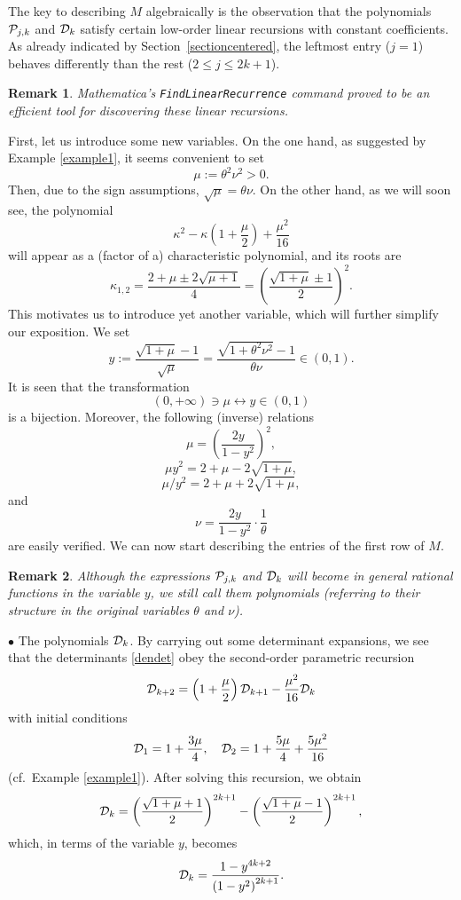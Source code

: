 \documentclass[a4paper]{article}
\newtheorem{remark}{Remark}
\newcommand{\te}{\theta}
\newcommand{\cP}{{\cal{P}}}
\newcommand{\cD}{{\cal{D}}}
\begin{document}
The key to describing $M$ algebraically is the observation that the polynomials $\cP_{j,k}$ and $\cD_{k}$ satisfy certain low-order linear recursions with constant coefficients. As already indicated by Section~\ref{sectioncentered}, the leftmost entry ($j=1$) behaves differently than the rest ($2\le j\le 2k+1$).


\begin{remark}
 \textit{Mathematica}'s  {\tt{FindLinearRecurrence}} command proved to be an efficient tool for discovering these linear recursions. 
\end{remark}
First, let us introduce some new variables. On the one hand, as suggested by Example \ref{example1}, it seems convenient to set
\[
\mu:=\te^2\nu^2>0.
\]
Then, due to the sign assumptions, $\sqrt{\mu}=\te\nu$. On the other hand, as we will soon see, the polynomial 
\[
\kappa ^2-\kappa  \left(1+\frac{\mu }{2}\right)+\frac{\mu ^2}{16}
\]
will appear as a (factor of a) characteristic polynomial, and its roots are
\begin{equation}\label{kappa12}
\kappa_{1,2}=\frac{2+\mu \pm 2 \sqrt{\mu +1}}{4}=\left(\frac{\sqrt{1+\mu}\pm 1}{2}\right)^2.
\end{equation}
This motivates us to introduce yet another variable, which will further simplify our exposition. We set
\begin{equation}\label{ydef01}
y:=\frac{\sqrt{1+\mu}-1}{\sqrt{\mu}}=\frac{\sqrt{1+\te^2\nu^2}-1}{\te\nu}\in (0,1).
\end{equation}
It is seen that the transformation
\[
(0,+\infty)\ni\mu \longleftrightarrow y\in(0,1)
\]
is a bijection. Moreover, the following (inverse) relations 
\[
\mu=\left(\frac{2y}{1-y^2}\right)^2,
\]
\[\mu y^2=2+\mu-2\sqrt{1+\mu},\]
\[\mu/y^2=2+\mu+2\sqrt{1+\mu},\]
and
\begin{equation}\label{fromytonu}
\nu=\frac{2y}{1-y^2}\cdot\frac{1}{\te}
\end{equation}
are easily verified. We can now start describing the entries of the first row of $M$.
\begin{remark}
Although the expressions $\cP_{j,k}$ and $\cD_{k}$ will become in general rational functions in the variable $y$, we still call them polynomials (referring to their structure in the original variables $\te$ and $\nu$). 
\end{remark}
$\bullet$ The polynomials $\cD_k$. By carrying out some determinant expansions, we see that the determinants \eqref{dendet} obey the second-order parametric recursion
\begin{equation}\label{Dkrec}
\cD_{k+2}=\left(1+\frac{\mu}{2}\right)\cD_{k+1}-\frac{\mu^2}{16}\cD_k
\end{equation}
with initial conditions
\[
\cD_1=1+\frac{3\mu}{4}, \quad \cD_2=1+\frac{5\mu}{4}+\frac{5\mu^2}{16}
\]
(cf.~Example \ref{example1}). After solving this recursion, we obtain
\[
\cD_k=\left(\frac{\sqrt{1+\mu}+1}{2}\right)^{2 k+1}- \left(\frac{\sqrt{1+\mu}-1}{2}\right)^{2 k+1},
\]
which, in terms of the variable $y$, becomes
\begin{equation}\label{expldet}
\cD_k=\frac{1-y^{4 k+2}}{\left(1-y^2\right)^{2 k+1} }.
\end{equation}
\end{document}
